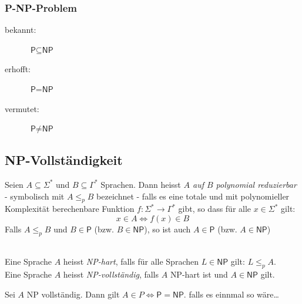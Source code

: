 \documentclass{scrartcl}
\begin{document}
\subsubsection*{\textsf{P-NP}-Problem}
\begin{description}
    \item[bekannt:] $\textsf{P} \subseteq \textsf{NP}$
    \item[erhofft:] $\textsf{P} = \textsf{NP}$
    \item[vermutet:] $\textsf{P} \not= \textsf{NP}$
\end{description}

\begin{center}
\scalebox{.75}{}
\end{center}

\subsection*{\textsf{NP}-Vollständigkeit}
\begin{shaded}
    Seien $A\subseteq\Sigma^*$ und $B\subseteq\Gamma^*$ Sprachen. Dann heisst \emph{$A$ auf $B$ polynomial reduzierbar} - symbolisch mit $A\leq_p B$ bezeichnet - falls es eine totale und mit polynomieller Komplexität berechenbare Funktion $f:\Sigma^*\to\Gamma^*$ gibt, so dass für alle $x\in\Sigma^*$ gilt:
    \[ x\in A\Longleftrightarrow f(x)\in B \]
    Falls $A\leq_p B$ und $B\in\mathsf{P}$ (bzw. $B\in\mathsf{NP}$), so ist auch $A\in\mathsf{P}$ (bzw. $A\in\mathsf{NP}$)
\end{shaded}

\begin{shaded}
\ \\
    Eine Sprache $A$ heisst \emph{\textsf{NP}-hart}, falls für alle Sprachen $L\in\mathsf{NP}$ gilt: $L\leq_p A$. \\[.5cm]
    Eine Sprache $A$ heisst \emph{\textsf{NP}-vollständig}, falls $A$ \textsf{NP}-hart ist und $A\in\mathsf{NP}$ gilt.
\end{shaded}

\begin{shaded}
    Sei $A$ \textsf{NP} vollständig. Dann gilt $A\in P \Leftrightarrow \mathsf{P} = \mathsf{NP}$. {\tiny falls es einnmal so wäre\dots}
\end{shaded}

\begin{center}
\scalebox{.75}{}
\end{center}
\end{document}
